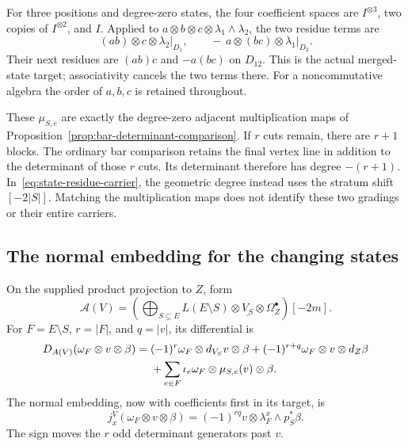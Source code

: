 For three positions and degree-zero states, the four coefficient spaces are
$I^{\otimes3}$, two copies of $I^{\otimes2}$, and $I$.
Applied to $a\otimes b\otimes c\otimes\lambda_1\wedge\lambda_2$, the two residue terms are
\[
(ab)\otimes c\otimes\lambda_2\big|_{D_1},\qquad
-\,a\otimes(bc)\otimes\lambda_1\big|_{D_2}.
\]
Their next residues are $(ab)c$ and $-a(bc)$ on $D_{12}$.
This is the actual merged-state target; associativity cancels the two terms there.
For a noncommutative algebra the order of $a,b,c$ is retained throughout.

These $\mu_{S,e}$ are exactly the degree-zero adjacent multiplication maps of
Proposition~\ref{prop:bar-determinant-comparison}.
If $r$ cuts remain, there are $r+1$ blocks.
The ordinary bar comparison retains the final vertex line in addition to the determinant of those $r$ cuts.
Its determinant therefore has degree $-(r+1)$.
In~\eqref{eq:state-residue-carrier}, the geometric degree instead uses the stratum shift $[-2|S|]$.
Matching the multiplication maps does not identify these two gradings or their entire carriers.

\subsection{The normal embedding for the changing states}
\label{subsec:state-normal-embedding}

On the supplied product projection to $Z$, form
\[
\mathcal A(V)=
\left(\bigoplus_{S\subseteq E}L(E\setminus S)\otimes\underline{V_S}\otimes\Omega_Z^\bullet\right)[-2m].
\]
For $F=E\setminus S$, $r=|F|$, and $q=|v|$, its differential is
\begin{align}
\label{eq:state-normal-differential}
D_{A(V)}(\omega_F\otimes v\otimes\beta)
={}&(-1)^r\omega_F\otimes d_{V_S}v\otimes\beta
+(-1)^{r+q}\omega_F\otimes v\otimes d_Z\beta\notag\\
&+\sum_{e\in F}\iota_e\omega_F\otimes\mu_{S,e}(v)\otimes\beta.
\end{align}
The normal embedding, now with coefficients first in its target, is
\begin{equation}
\label{eq:state-normal-embedding}
j_x^V(\omega_F\otimes v\otimes\beta)
=(-1)^{rq}v\otimes\lambda_F^x\wedge p_S^*\beta.
\end{equation}
The sign moves the $r$ odd determinant generators past $v$.

